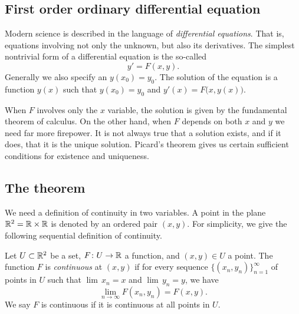 \subsection{First order ordinary differential equation}

Modern science is described in the language of
\emph{differential equations}.
That is, equations involving not only the unknown, but also its
derivatives.  The simplest nontrivial form of a differential equation is
the so-called \emph{}
\begin{equation*}
y' = F(x,y) .
\end{equation*}
Generally we also specify an \emph{}
$y(x_0)=y_0$.  The solution of
the equation is a function $y(x)$ such that 
$y(x_0)=y_0$ and $y'(x) = F\bigl(x,y(x)\bigr)$.

When $F$ involves only the $x$ variable, the solution is given by the
fundamental theorem of calculus.  On the other hand, when $F$ depends
on both $x$ and $y$ we need far more firepower.  It is not always
true that a solution exists, and if it does, that it is the unique solution.
Picard's theorem gives us certain sufficient conditions for existence
and uniqueness.

\subsection{The theorem}

We need a definition of continuity in two variables.  A point in the
plane ${\mathbb{R}}^2 = {\mathbb{R}} \times {\mathbb{R}}$ is denoted by an ordered pair $(x,y)$.
For simplicity,
we give the following sequential definition of continuity.

\begin{defn}
Let $U \subset {\mathbb{R}}^2$ be a set, $F \colon U \to {\mathbb{R}}$ a function,
and $(x,y) \in U$ a point.  The function $F$ is \emph{continuous}
at $(x,y)$ if 
for every sequence
$\bigl\{ (x_n,y_n) \bigr\}_{n=1}^\infty$ of points in $U$ such that
$\lim\, x_n = x$ and 
$\lim\, y_n = y$, we have 
\begin{equation*}
\lim_{n \to \infty} F(x_n,y_n) = 
F(x,y) .
\end{equation*}
We say $F$ is continuous if it is continuous at all points in $U$.
\end{defn}

